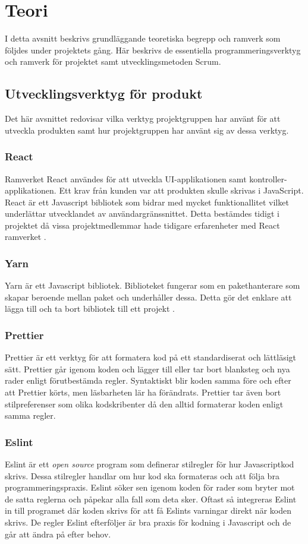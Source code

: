 \chapter{Teori}
\label{cha:theory}
I detta avsnitt beskrivs grundläggande teoretiska begrepp och ramverk som följdes under projektets gång. Här beskrivs de essentiella programmeringsverktyg och ramverk för projektet samt utvecklingsmetoden Scrum. 
\section{Utvecklingsverktyg för produkt}
Det här avsnittet redovisar vilka verktyg projektgruppen har använt för att utveckla produkten samt hur projektgruppen har använt sig av dessa verktyg.

\subsection*{React}
Ramverket React användes för att utveckla UI-applikationen samt kontroller-applikationen. Ett krav från kunden var att produkten skulle skrivas i JavaScript. React är ett Javascript bibliotek som bidrar med mycket funktionallitet vilket underlättar utvecklandet av användargränssnittet.  Detta bestämdes tidigt i projektet då vissa projektmedlemmar hade tidigare erfarenheter med React ramverket \cite{ReactAJa67:online}.

\subsection*{Yarn}
Yarn är ett Javascript bibliotek. Biblioteket fungerar som en pakethanterare som skapar beroende mellan paket och underhåller dessa. Detta gör det enklare att lägga till och ta bort bibliotek till ett projekt \cite{GettingS85:online}.

\subsection*{Prettier}
Prettier är ett verktyg för att formatera kod på ett standardiserat och lättläsigt sätt\cite{prettier}. Prettier går igenom koden och lägger till eller tar bort blanksteg och nya rader enligt förutbestämda regler. Syntaktiskt blir koden samma före och efter att Prettier körts, men läsbarheten lär ha förändrats. Prettier tar även bort stilpreferenser som olika kodskribenter då den alltid formaterar koden enligt samma regler.


\subsection*{Eslint}
Eslint är ett \textit{open source} program som definerar stilregler för hur Javascriptkod skrivs. Dessa stilregler handlar  om hur kod ska formateras och att följa bra programmeringspraxis. Eslint söker sen igenom koden för rader som bryter mot de satta reglerna och påpekar alla fall som deta sker. Oftast så integreras Eslint in till programet där koden skrivs för att få Eslints varningar direkt när koden skrivs. De regler Eslint efterföljer är bra praxis för kodning i Javascript och de går att ändra på efter behov.


